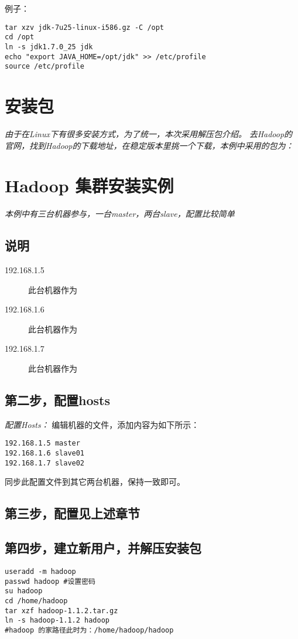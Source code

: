\documentclass{article}
\begin{document}
\textsf{例子：}
\begin{verbatim}
tar xzv jdk-7u25-linux-i586.gz -C /opt
cd /opt
ln -s jdk1.7.0_25 jdk
echo "export JAVA_HOME=/opt/jdk" >> /etc/profile
source /etc/profile
\end{verbatim}

\section{安装包}
\textit{由于在Linux下有很多安装方式，为了统一，本次采用解压包介绍。}
\textit{去Hadoop的官网，找到Hadoop的下载地址，在稳定版本里挑一个下载，本例中采用的包为：}


\section{Hadoop 集群安装实例}
\textit{本例中有三台机器参与，一台master，两台slave，配置比较简单}

\subsection{说明}
\begin{description}
\item[192.168.1.5] 此台机器作为
\item[192.168.1.6] 此台机器作为
\item[192.168.1.7] 此台机器作为
\end{description}

\subsection{第二步，配置hosts}
\textit{配置Hosts：}
编辑机器的文件，添加内容为如下所示：

\begin{verbatim}
192.168.1.5 master
192.168.1.6 slave01
192.168.1.7 slave02
\end{verbatim}

同步此配置文件到其它两台机器，保持一致即可。

\subsection{第三步，配置见上述章节}

\subsection{第四步，建立新用户，并解压安装包}
\begin{verbatim}
useradd -m hadoop
passwd hadoop #设置密码
su hadoop
cd /home/hadoop
tar xzf hadoop-1.1.2.tar.gz 
ln -s hadoop-1.1.2 hadoop
#hadoop 的家路径此时为：/home/hadoop/hadoop
\end{verbatim}
\end{document}
